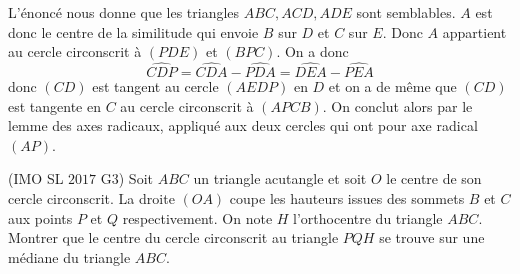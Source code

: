 \begin{sol}
L'énoncé nous donne que les triangles $ABC,ACD,ADE$ sont semblables. $A$ est donc le centre de la similitude qui envoie $B$ sur $D$ et $C$ sur $E$. Donc $A$ appartient au cercle circonscrit à $(PDE)$ et $(BPC)$.
On a donc $$\widehat{CDP}=\widehat{CDA}-\widehat{PDA}=\widehat{DEA}-\widehat{PEA}$$ donc $(CD)$ est tangent au cercle $(AEDP)$ en $D$ et on a de même que $(CD)$ est tangente en $C$ au cercle circonscrit à $(APCB)$. On conclut alors par le lemme des axes radicaux, appliqué aux deux cercles qui ont pour axe radical $(AP)$.
\end{sol}


\begin{exo}
(IMO SL $2017$ G$3$)
Soit $ABC$ un triangle acutangle et soit $O$ le centre de son cercle circonscrit. La droite $(OA)$ coupe les hauteurs issues des sommets $B$ et $C$ aux points $P$ et $Q$ respectivement. On note $H$ l'orthocentre du triangle $ABC$. Montrer que le centre du cercle circonscrit au triangle $PQH$ se trouve sur une médiane du triangle $ABC$.
\end{exo}


